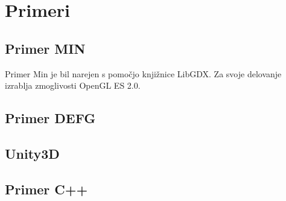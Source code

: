 \chapter{Primeri}

\section{Primer MIN}

Primer Min je bil narejen s pomočjo knjižnice LibGDX. Za svoje delovanje izrablja zmoglivosti OpenGL ES 2.0. 

\section{Primer DEFG} 

\section{Unity3D}

\section{Primer C++}


